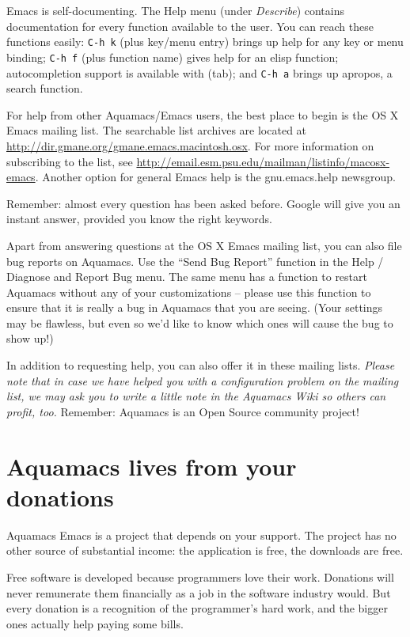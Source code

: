 \documentclass[11pt,letterpaper]{article}
\begin{document}
Emacs is self-documenting.  The Help menu (under \emph{Describe}) contains documentation for every function available to the user.  You can reach these functions easily: {\tt C-h k} (plus key/menu entry) brings up help for any key or menu binding; {\tt C-h f} (plus function name) gives help for an elisp function; autocompletion support is available with (tab); and {\tt C-h a} brings up apropos, a search function.

For help from other Aquamacs/Emacs users, the best place to begin is the OS X Emacs mailing list. The searchable list archives are located at \url{http://dir.gmane.org/gmane.emacs.macintosh.osx}. For more information on subscribing to the list, see \url{http://email.esm.psu.edu/mailman/listinfo/macosx-emacs}.  Another option for general Emacs help is the gnu.emacs.help newsgroup.

Remember: almost every question has been asked before.  Google will give you an instant answer, provided you know the right keywords.

Apart from answering questions at the OS X Emacs mailing list, you can also file bug reports on Aquamacs. Use the ``Send Bug Report'' function in the Help / Diagnose and Report Bug menu.  The same menu has a function to restart Aquamacs without any of your customizations -- please use this function to ensure that it is really a bug in Aquamacs that you are seeing.  (Your settings may be flawless, but even so we'd like to know which ones will cause the bug to show up!)

In addition to requesting help, you can also offer it in these mailing lists. \emph{Please note that in case we have helped you with a configuration problem on the mailing list, we may ask you to write a little note in the Aquamacs Wiki so others can profit, too.} Remember: Aquamacs is an Open Source community project!

\section{Aquamacs lives from your donations}

Aquamacs Emacs is a project that depends on your support. The project
has no other source of substantial income: the application is free,
the downloads are free. 

Free software is developed because programmers love their work. Donations will never remunerate them financially as a job in the software industry would. But every donation is a recognition of the programmer's hard work, and the bigger ones actually help paying some bills.
\end{document}
